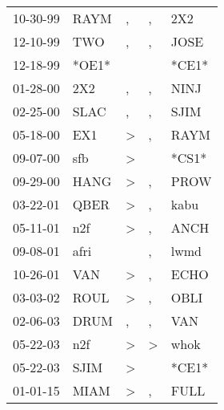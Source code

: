 \begin{supertabular}{p{0.07\textwidth}p{0.06\textwidth}p{0.02\textwidth}p{0.02\textwidth}p{0.06\textwidth}}
 10-30-99\textsuperscript{} &  RAYM\textsuperscript{} &                , &             , &   2X2\textsuperscript{} \\
 12-10-99\textsuperscript{} &   TWO\textsuperscript{} &                , &             , &  JOSE\textsuperscript{} \\
 12-18-99\textsuperscript{} &                   *OE1* &                  &               &                   *CE1* \\
 01-28-00\textsuperscript{} &   2X2\textsuperscript{} &                , &             , &  NINJ\textsuperscript{} \\
 02-25-00\textsuperscript{} &  SLAC\textsuperscript{} &                , &             , &  SJIM\textsuperscript{} \\
 05-18-00\textsuperscript{} &   EX1\textsuperscript{} &     \textgreater &             , &  RAYM\textsuperscript{} \\
 09-07-00\textsuperscript{} &   sfb\textsuperscript{} &     \textgreater &               &                   *CS1* \\
 09-29-00\textsuperscript{} &  HANG\textsuperscript{} &     \textgreater &             , &  PROW\textsuperscript{} \\
 03-22-01\textsuperscript{} &  QBER\textsuperscript{} &     \textgreater &             , &  kabu\textsuperscript{} \\
 05-11-01\textsuperscript{} &   n2f\textsuperscript{} &     \textgreater &             , &  ANCH\textsuperscript{} \\
 09-08-01\textsuperscript{} &  afri\textsuperscript{} &                  &             , &  lwmd\textsuperscript{} \\
 10-26-01\textsuperscript{} &   VAN\textsuperscript{} &     \textgreater &             , &  ECHO\textsuperscript{} \\
 03-03-02\textsuperscript{} &  ROUL\textsuperscript{} &     \textgreater &             , &  OBLI\textsuperscript{} \\
 02-06-03\textsuperscript{} &  DRUM\textsuperscript{} &                , &             , &   VAN\textsuperscript{} \\
 05-22-03\textsuperscript{} &   n2f\textsuperscript{} &     \textgreater &  \textgreater &  whok\textsuperscript{} \\
 05-22-03\textsuperscript{} &  SJIM\textsuperscript{} &     \textgreater &               &                   *CE1* \\
 01-01-15\textsuperscript{} &  MIAM\textsuperscript{} &     \textgreater &             , &  FULL\textsuperscript{} \\

\end{supertabular}
